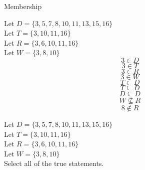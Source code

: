 \documentclass{ximera}
\begin{document}
\begin{example} Membership


Let $D = \{ 3, 5, 7, 8, 10, 11, 13, 15, 16 \}$  \\
Let $T = \{ 3, 10, 11, 16 \}$  \\
Let $R = \{ 3, 6, 10, 11, 16 \}$   \\
Let $W = \{ 3, 8, 10 \}$   \\


\[   3 \in D  \]
\[   3 \in T  \]
\[   3 \in R  \]
\[   3 \in W  \]
\[   T \subset D \]
\[   T \subseteq D \]
\[   D \subseteq D \]
\[   W \nsubseteq R \]
\[   8 \notin R  \]


\end{example}



\begin{question}


Let $D = \{ 3, 5, 7, 8, 10, 11, 13, 15, 16 \}$  \\
Let $T = \{ 3, 10, 11, 16 \}$  \\
Let $R = \{ 3, 6, 10, 11, 16 \}$   \\
Let $W = \{ 3, 8, 10 \}$   \\


Select all of the true statements.

\begin{selectAll}
\end{selectAll}


\end{question}
\end{document}
